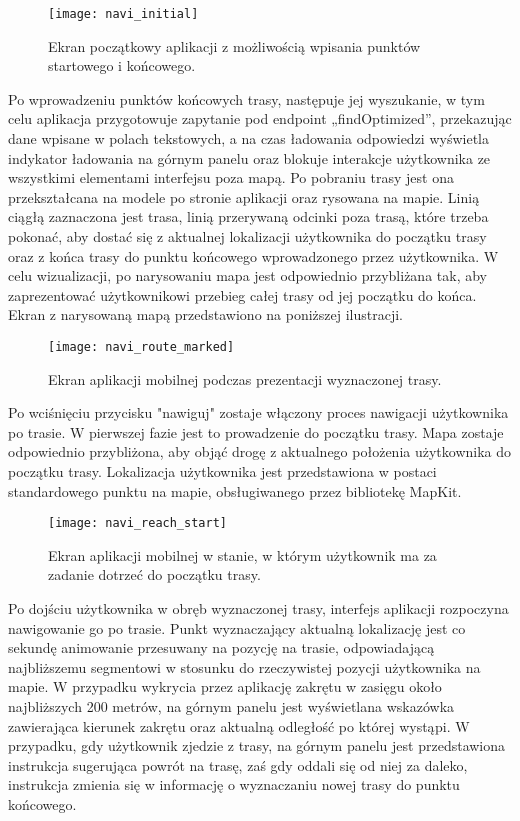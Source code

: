 \begin{figure}[H]
\centering
\texttt{[image: navi\_initial]}
\caption{Ekran początkowy aplikacji z możliwością wpisania punktów startowego i końcowego.}
\end{figure}

Po wprowadzeniu punktów końcowych trasy, następuje jej wyszukanie, w tym celu aplikacja przygotowuje zapytanie pod endpoint „findOptimized”, przekazując dane wpisane w polach tekstowych, a na czas ładowania odpowiedzi wyświetla indykator ładowania na górnym panelu oraz blokuje interakcje użytkownika ze wszystkimi elementami interfejsu poza mapą. Po pobraniu trasy jest ona przekształcana na modele po stronie aplikacji oraz rysowana na mapie. Linią ciągłą zaznaczona jest trasa, linią przerywaną odcinki poza trasą, które trzeba pokonać, aby dostać się z aktualnej lokalizacji użytkownika do początku trasy oraz z końca trasy do punktu końcowego wprowadzonego przez użytkownika. W celu wizualizacji, po narysowaniu mapa jest odpowiednio przybliżana tak, aby zaprezentować użytkownikowi przebieg całej trasy od jej początku do końca. Ekran z narysowaną mapą przedstawiono na poniższej ilustracji.

\begin{figure}[H]
	\begin{center}
		\texttt{[image: navi\_route\_marked]}
	\end{center}
	\caption{Ekran aplikacji mobilnej podczas prezentacji wyznaczonej trasy.}
\end{figure}

Po wciśnięciu przycisku "nawiguj" zostaje włączony proces nawigacji użytkownika po trasie. W pierwszej fazie jest to prowadzenie do początku trasy. Mapa zostaje odpowiednio przybliżona, aby objąć drogę z aktualnego położenia użytkownika do początku trasy. Lokalizacja użytkownika jest przedstawiona w postaci standardowego punktu na mapie, obsługiwanego przez bibliotekę MapKit.

\begin{figure}[H]
\centering
\texttt{[image: navi\_reach\_start]}
\caption{Ekran aplikacji mobilnej w stanie, w którym użytkownik ma za zadanie dotrzeć do początku trasy.}
\end{figure}

Po dojściu użytkownika w obręb wyznaczonej trasy, interfejs aplikacji rozpoczyna nawigowanie go po trasie. Punkt wyznaczający aktualną lokalizację jest co sekundę animowanie przesuwany na pozycję na trasie, odpowiadającą najbliższemu segmentowi w stosunku do rzeczywistej pozycji użytkownika na mapie. W przypadku wykrycia przez aplikację zakrętu w zasięgu około najbliższych 200 metrów, na górnym panelu jest wyświetlana wskazówka zawierająca kierunek zakrętu oraz aktualną odległość po której wystąpi. W przypadku, gdy użytkownik zjedzie z trasy, na górnym panelu jest przedstawiona instrukcja sugerująca powrót na trasę, zaś gdy oddali się od niej za daleko, instrukcja zmienia się w informację o wyznaczaniu nowej trasy do punktu końcowego.

